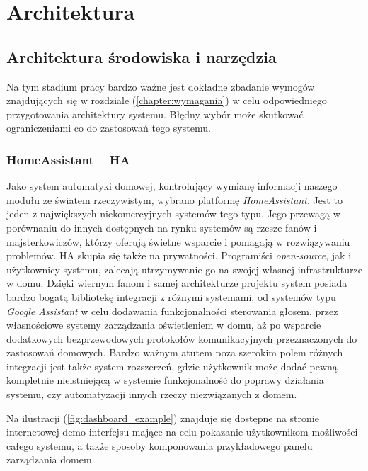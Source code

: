 
\chapter{Architektura}

\section{Architektura środowiska i narzędzia}
Na tym stadium pracy bardzo ważne jest dokładne zbadanie wymogów znajdujących się w rozdziale (\ref{chapter:wymagania}) w celu odpowiedniego przygotowania architektury systemu. Błędny wybór może skutkować ograniczeniami co do zastosowań tego systemu.

\subsection{HomeAssistant -- HA}
Jako system automatyki domowej, kontrolujący wymianę informacji naszego modułu ze światem rzeczywistym, wybrano platformę \textit{HomeAssistant}. Jest to jeden z największych niekomercyjnych systemów tego typu. Jego przewagą w porównaniu do innych dostępnych na rynku systemów są rzesze fanów i majsterkowiczów, którzy oferują świetne wsparcie i pomagają w rozwiązywaniu problemów. HA skupia się także na prywatności. Programiści \textit{open-source}, jak i użytkownicy systemu, zalecają utrzymywanie go na swojej własnej infrastrukturze w domu. Dzięki wiernym fanom i samej architekturze projektu system posiada bardzo bogatą bibliotekę integracji z różnymi systemami, od systemów typu \textit{Google Assistant} w celu dodawania funkcjonalności sterowania głosem, przez własnościowe systemy zarządzania oświetleniem w domu, aż po wsparcie dodatkowych bezprzewodowych protokołów komunikacyjnych przeznaczonych do zastosowań domowych. Bardzo ważnym atutem poza szerokim polem różnych integracji jest także system rozszerzeń, gdzie użytkownik może dodać pewną kompletnie nieistniejącą w systemie funkcjonalność do poprawy działania systemu, czy automatyzacji innych rzeczy niezwiązanych z domem.

Na ilustracji (\ref{fig:dashboard_example}) znajduje się dostępne na stronie internetowej demo interfejsu mające na celu pokazanie użytkownikom możliwości całego systemu, a także sposoby komponowania przykładowego panelu zarządzania domem.

